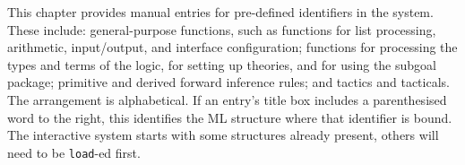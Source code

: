 This chapter provides manual entries for pre-defined \ML{} identifiers
in the \HOL{} system.  These include: general-purpose functions, such
as functions for list processing, arithmetic, input/output, and
interface configuration; functions for processing the types and terms
of the \HOL{} logic, for setting up theories, and for using the
subgoal package; primitive and derived forward inference rules; and
tactics and tacticals.  The arrangement is alphabetical.  If an
entry's title box includes a parenthesised word to the right, this
identifies the ML structure where that identifier is bound.
The interactive system starts with some structures already present,
others will need to be \texttt{load}-ed first.

